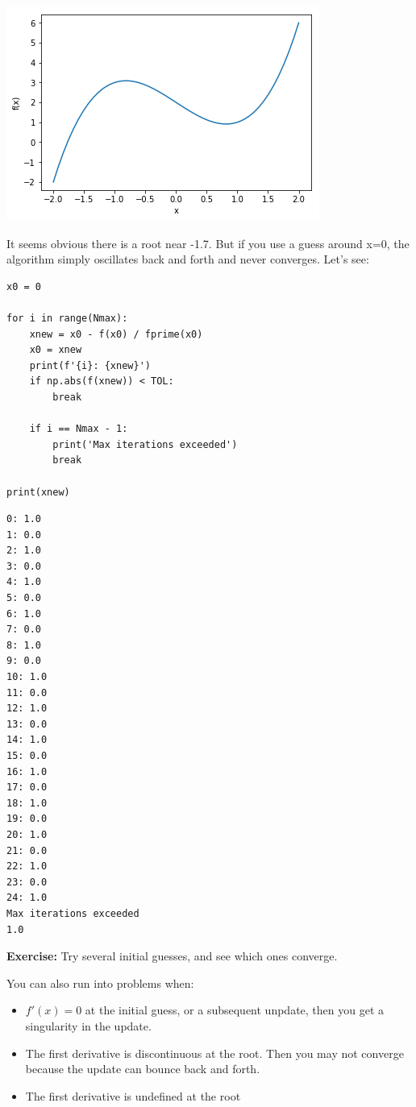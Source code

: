 \documentclass[11pt]{article}
\begin{document}
\begin{center}
\includegraphics[width=.9\linewidth]{obipy-resources/a42b059ba3fd2f94b3a34f1c9b427f54-26729HKi.png}
\end{center}

It seems obvious there is a root near -1.7. But if you use a guess around x=0, the algorithm simply oscillates back and forth and never converges. Let's see:

\begin{verbatim}
x0 = 0

for i in range(Nmax):
    xnew = x0 - f(x0) / fprime(x0)
    x0 = xnew
    print(f'{i}: {xnew}')
    if np.abs(f(xnew)) < TOL:
        break

    if i == Nmax - 1:
        print('Max iterations exceeded')
        break

print(xnew)
\end{verbatim}

\begin{verbatim}
0: 1.0
1: 0.0
2: 1.0
3: 0.0
4: 1.0
5: 0.0
6: 1.0
7: 0.0
8: 1.0
9: 0.0
10: 1.0
11: 0.0
12: 1.0
13: 0.0
14: 1.0
15: 0.0
16: 1.0
17: 0.0
18: 1.0
19: 0.0
20: 1.0
21: 0.0
22: 1.0
23: 0.0
24: 1.0
Max iterations exceeded
1.0

\end{verbatim}

\textbf{Exercise:} Try several initial guesses, and see which ones converge.


You can also run into problems when:

\begin{itemize}
\item \(f'(x) = 0\) at the initial guess, or a subsequent unpdate, then you get a singularity in the update.
\item The first derivative is discontinuous at the root. Then you may not converge because the update can bounce back and forth.
\item The first derivative is undefined at the root
\end{itemize}
\end{document}
